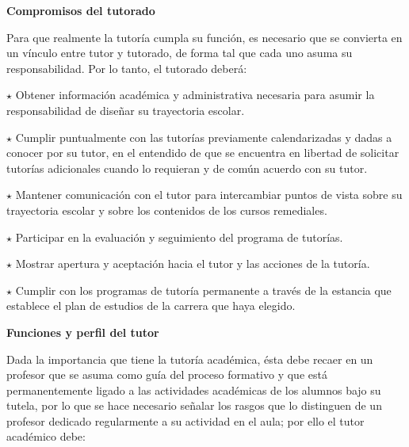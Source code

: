 \bigskip
\textbf{Compromisos del tutorado}

Para  que  realmente   la  tutoría  cumpla  su  función,   es  necesario   que  se convierta  en un vínculo entre tutor y tutorado,  de forma tal que cada uno asuma su responsabilidad.
Por lo tanto, el tutorado deberá:

\begin{Obs}
\item[$\star$] Obtener información académica y administrativa necesaria para asumir la responsabilidad de diseñar su trayectoria escolar.
\item[$\star$] Cumplir  puntualmente con  las tutorías previamente calendarizadas y dadas  a conocer  por  su  tutor, en el entendido de que se encuentra en  libertad de solicitar  tutorías adicionales  cuando lo  requieran y de común acuerdo con su tutor.
\newpage

\item[$\star$] Mantener comunicación con el tutor para intercambiar puntos de vista sobre su trayectoria escolar y sobre los contenidos de los cursos remediales.
\item[$\star$] Participar en la evaluación y seguimiento del programa de tutorías.
\item[$\star$] Mostrar apertura y aceptación hacia el tutor y las acciones de la  tutoría.
\item[$\star$]Cumplir con los programas de tutoría permanente a través de la estancia que establece el plan de estudios de la carrera que haya elegido.
\end{Obs}

\bigskip
\textbf{Funciones y perfil del tutor}

Dada la importancia que tiene la tutoría académica, ésta debe recaer en un profesor que se asuma como guía del proceso formativo y que está permanentemente ligado a las actividades académicas de los alumnos bajo su tutela, por lo que se hace necesario señalar los rasgos que lo distinguen de un profesor dedicado regularmente a su actividad en el aula; por ello el tutor académico debe:


